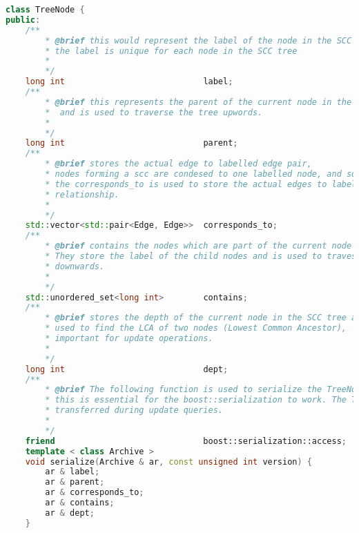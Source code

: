 \begin{lstlisting}[language=C++, caption={SCC-Tree Node}, label={lst:scc_tree_node}]
class TreeNode {
public:
    /**
        * @brief this would represent the label of the node in the SCC tree
        * the label is unique for each node in the SCC tree
        * 
        */
    long int                            label;
    /**
        * @brief this represents the parent of the current node in the SCC tree
        *  and is used to traverse the tree upwords.
        * 
        */
    long int                            parent;
    /**
        * @brief stores the actual edge to labelled edge pair,
        * nodes forming a scc are condesed to one labelled node, and so are the edges,
        * the corresponds_to is used to store the actual edges to labelled edges
        * relationship.
        * 
        */
    std::vector<std::pair<Edge, Edge>>  corresponds_to;
    /**
        * @brief contains the nodes which are part of the current node in the SCC tree.
        * They store the label of the child nodes and is used to travese the tree 
        * downwards.
        * 
        */
    std::unordered_set<long int>        contains;
    /**
        * @brief stores the depth of the current node in the SCC tree and is
        * used to find the LCA of two nodes (Lowest Common Ancestor), 
        * important for update operations.
        * 
        */
    long int                            dept;
    /**
        * @brief The following function is used to serialize the TreeNode object,
        * this is essential for the boost::serialization to work. The TreeNodes are 
        * transferred during update queries.
        * 
        */
    friend                              boost::serialization::access;
    template < class Archive >
    void serialize(Archive & ar, const unsigned int version) {
        ar & label;
        ar & parent;
        ar & corresponds_to;
        ar & contains;
        ar & dept;
    }


\end{lstlisting}
